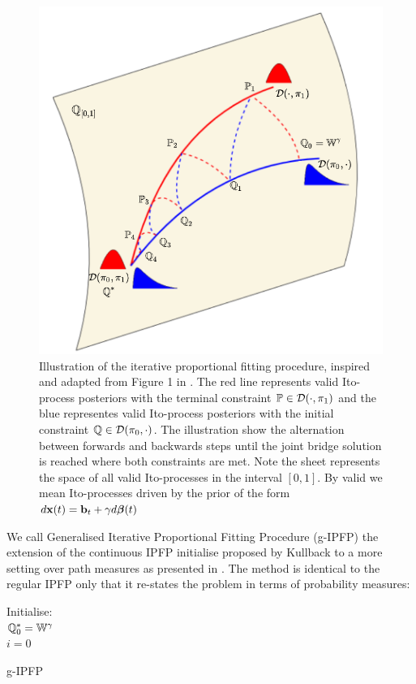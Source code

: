 \documentclass[a4paper,12pt,twoside,openright]{report}
\theoremstyle{definition}
\begin{document}
\begin{figure}[t!]
    \centering
    \includegraphics[]{images/g-IPFP_ready.PNG}
    \caption{Illustration of the iterative proportional fitting procedure, inspired and adapted from Figure 1 in \cite{bernton2019schr}. The red line represents valid Ito-process posteriors with the terminal constraint ${\mathbb{P}} \in {\mathcal{D}}(\cdot, \pi_1)$ and the blue representes valid Ito-process posteriors with the initial constraint ${\mathbb{Q}} \in {\mathcal{D}}( \pi_0, \cdot)$. The illustration show the alternation between forwards and backwards steps until the joint bridge solution is reached where both constraints are met. Note the sheet represents the space of all valid Ito-processes in the interval $[0,1]$. By valid we mean Ito-processes driven by the prior of the form $d{\mathbf{x}}(t) = {\mathbf{b}}_t + \gamma d{\bm{\beta}}(t)$}
    \label{fig:info_pro}
\end{figure}

We call Generalised Iterative Proportional Fitting Procedure (g-IPFP) the extension of the continuous IPFP initialise proposed by Kullback to a more setting over path measures as presented in \cite{cramer2000probability, bernton2019schr}. The method is identical to the regular IPFP only that it re-states the problem in terms of probability measures:
\begin{algorithm} \label{alg:gipfp}
Initialise:\\
${\mathbb{Q}}^{*}_0 =\mathbb{W}^{\gamma}$\\
$i=0$ \\
\caption{g-IPFP \citep{cramer2000probability} }
\end{algorithm}
\end{document}
